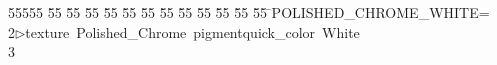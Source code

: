 %
%
\begin{tabbing}
55555 \= 55 \= 55 \= 55 \= 55 \= 55 \= 55 \= 55 \= 55 \= 55 \= 55 \= 55 \= 55 \= \>POLISHED\_CHROME\_WHITE=\\[0pt]
2\>$\triangleright$\>texture\ Polished\_Chrome\ pigmentquick\_color\ White\ \\[0pt]
3\>\end{tabbing}
